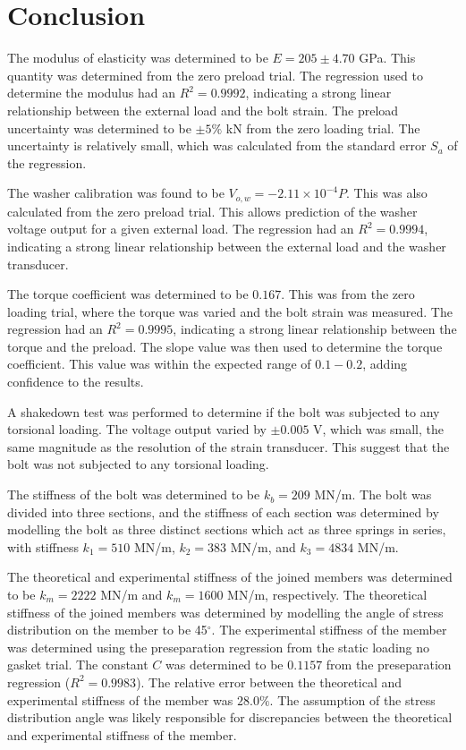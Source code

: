 \section{Conclusion}
The modulus of elasticity was determined to be $E = 205 \pm 4.70$ GPa. This quantity was determined from the zero preload trial. The regression used to determine the modulus had an $R^2 = 0.9992$, indicating a strong linear relationship between the external load and the bolt strain. The preload uncertainty was determined to be $\pm 5\%$ kN from the zero loading trial. The uncertainty is relatively small, which was calculated from the standard error $S_{a}$ of the regression.

The washer calibration was found to be $V_{o, w} = -2.11 \times 10^{-4}P$. This was also calculated from the zero preload trial. This allows prediction of the washer voltage output for a given external load. The regression had an $R^2 = 0.9994$, indicating a strong linear relationship between the external load and the washer transducer.


The torque coefficient was determined to be $0.167$. This was from the zero loading trial, where the torque was varied and the bolt strain was measured. The regression had an $R^2 = 0.9995$, indicating a strong linear relationship between the torque and the preload. The slope value was then used to determine the torque coefficient. This value was within the expected range of $0.1 - 0.2$, adding confidence to the results.

A shakedown test was performed to determine if the bolt was subjected to any torsional loading. The voltage output varied by $\pm 0.005$ V, which was small, the same magnitude as the resolution of the strain transducer. This suggest that the bolt was not subjected to any torsional loading.

The stiffness of the bolt was determined to be $k_b = 209$ MN/m. The bolt was divided into three sections, and the stiffness of each section was determined by modelling the bolt as three distinct sections which act as three springs in series, with stiffness $k_1 = 510$ MN/m, $k_2 = 383$ MN/m, and $k_3 = 4834$ MN/m. 

The theoretical and experimental stiffness of the joined members was determined to be $k_m = 2222$ MN/m and $k_m = 1600$ MN/m, respectively. The theoretical stiffness of the joined members was determined by modelling the angle of stress distribution on the member to be 45$^\circ$. The experimental stiffness of the member was determined using the preseparation regression from the static loading no gasket trial. The constant $C$ was determined to be $0.1157$ from the preseparation regression ($R^2 = 0.9983$). The relative error between the theoretical and experimental stiffness of the member was $28.0\%$. The assumption of the stress distribution angle was likely responsible for discrepancies between the theoretical and experimental stiffness of the member. 

